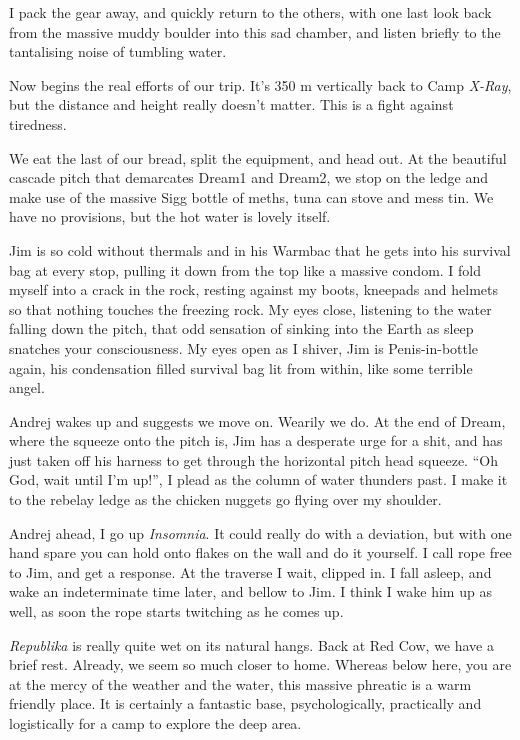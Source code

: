 I pack the gear away, and quickly return to the others, with one last
look back from the massive muddy boulder into this sad chamber, and
listen briefly to the tantalising noise of tumbling water.

Now begins the real efforts of our trip. It's 350 m vertically back to
Camp \emph{X-Ray}, but the distance and height really doesn't matter.
This is a fight against tiredness.

We eat the last of our bread, split the equipment, and head out. At the
beautiful cascade pitch that demarcates Dream1 and Dream2, we stop on
the ledge and make use of the massive Sigg bottle of meths, tuna can
stove and mess tin. We have no provisions, but the hot water is lovely
itself.

Jim is so cold without thermals and in his Warmbac that he gets into his
survival bag at every stop, pulling it down from the top like a massive
condom. I fold myself into a crack in the rock, resting against my
boots, kneepads and helmets so that nothing touches the freezing rock.
My eyes close, listening to the water falling down the pitch, that odd
sensation of sinking into the Earth as sleep snatches your
consciousness. My eyes open as I shiver, Jim is Penis-in-bottle again,
his condensation filled survival bag lit from within, like some terrible
angel.

Andrej wakes up and suggests we move on. Wearily we do. At the end of
Dream, where the squeeze onto the pitch is, Jim has a desperate urge for
a shit, and has just taken off his harness to get through the horizontal
pitch head squeeze. ``Oh God, wait until I'm up!'', I plead as the
column of water thunders past. I make it to the rebelay ledge as the
chicken nuggets go flying over my shoulder.

Andrej ahead, I go up \emph{Insomnia}. It could really do with a
deviation, but with one hand spare you can hold onto flakes on the wall
and do it yourself. I call rope free to Jim, and get a response. At the
traverse I wait, clipped in. I fall asleep, and wake an indeterminate
time later, and bellow to Jim. I think I wake him up as well, as soon
the rope starts twitching as he comes up.

\emph{Republika} is really quite wet on its natural hangs. Back at Red
Cow, we have a brief rest. Already, we seem so much closer to home.
Whereas below here, you are at the mercy of the weather and the water,
this massive phreatic is a warm friendly place. It is certainly a
fantastic base, psychologically, practically and logistically for a camp
to explore the deep area.

